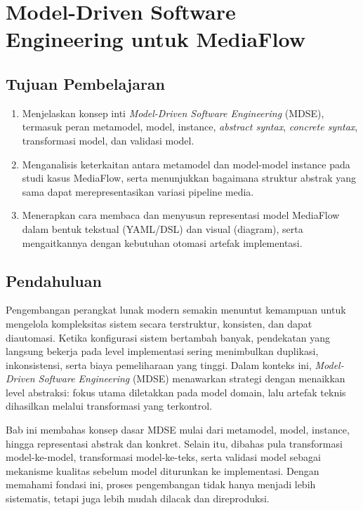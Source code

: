 \chapter{Model-Driven Software Engineering untuk MediaFlow}
\label{chap:mdse-mediaflow}

\section*{Tujuan Pembelajaran}
\begin{enumerate}
    \item Menjelaskan konsep inti \textit{Model-Driven Software Engineering} (MDSE), termasuk peran metamodel, model, instance, \textit{abstract syntax}, \textit{concrete syntax}, transformasi model, dan validasi model.
    \item Menganalisis keterkaitan antara metamodel dan model-model instance pada studi kasus MediaFlow, serta menunjukkan bagaimana struktur abstrak yang sama dapat merepresentasikan variasi pipeline media.
    \item Menerapkan cara membaca dan menyusun representasi model MediaFlow dalam bentuk tekstual (YAML/DSL) dan visual (diagram), serta mengaitkannya dengan kebutuhan otomasi artefak implementasi.
\end{enumerate}

\section{Pendahuluan}

Pengembangan perangkat lunak modern semakin menuntut kemampuan untuk mengelola kompleksitas sistem secara terstruktur, konsisten, dan dapat diautomasi. Ketika konfigurasi sistem bertambah banyak, pendekatan yang langsung bekerja pada level implementasi sering menimbulkan duplikasi, inkonsistensi, serta biaya pemeliharaan yang tinggi. Dalam konteks ini, \textit{Model-Driven Software Engineering} (MDSE) menawarkan strategi dengan menaikkan level abstraksi: fokus utama diletakkan pada model domain, lalu artefak teknis dihasilkan melalui transformasi yang terkontrol.

Bab ini membahas konsep dasar MDSE mulai dari metamodel, model, instance, hingga representasi abstrak dan konkret. Selain itu, dibahas pula transformasi model-ke-model, transformasi model-ke-teks, serta validasi model sebagai mekanisme kualitas sebelum model diturunkan ke implementasi. Dengan memahami fondasi ini, proses pengembangan tidak hanya menjadi lebih sistematis, tetapi juga lebih mudah dilacak dan direproduksi.

